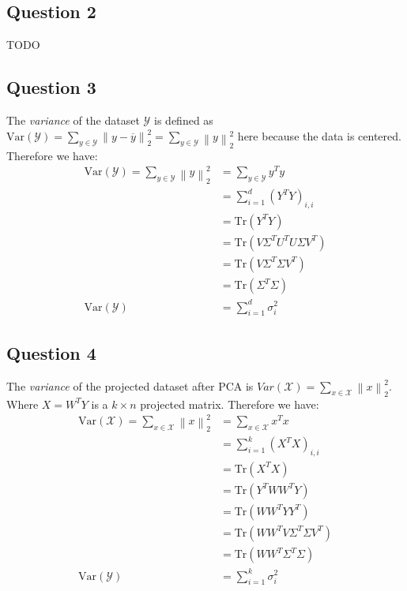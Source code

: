 \documentclass{article}
\begin{document}
\subsection{Question 2}

TODO

\subsection{Question 3}

The \textit{variance} of the dataset $\mathcal{Y}$ is defined as $\text{Var}(\mathcal{Y}) = \sum_{y \in \mathcal{Y}} \left\lVert y - \overline{y} \right\rVert^2_2 = \sum_{y \in \mathcal{Y}} \left\lVert y \right\rVert^2_2$ here because the data is centered. Therefore we have:
\begin{equation}
    \begin{split}
        \text{Var}(\mathcal{Y}) = \sum_{y \in \mathcal{Y}} \left\lVert y \right\rVert^2_2 &= \sum_{y \in \mathcal{Y}} y^T y \\
        &= \sum_{i = 1}^d (Y^T Y)_{i, i} \\
        &= \text{Tr}(Y^T Y) \\
        &= \text{Tr}(V \Sigma^T U^T U \Sigma V^T) \\
        &= \text{Tr}(V \Sigma^T \Sigma V^T) \\
        &= \text{Tr}(\Sigma^T \Sigma) \\
        \text{Var}(\mathcal{Y}) &= \sum_{i = 1}^d \sigma_i^2
    \end{split}
\end{equation}

\subsection{Question 4}

The \textit{variance} of the projected dataset after PCA is $Var(\mathcal{X}) = \sum_{x \in \mathcal{X}} \left\lVert x \right\rVert^2_2$. Where $X = W^TY$ is a $k \times n$ projected matrix. Therefore we have:
\begin{equation}
    \begin{split}
        \text{Var}(\mathcal{X}) = \sum_{x \in \mathcal{X}} \left\lVert x \right\rVert^2_2 &= \sum_{x \in \mathcal{X}} x^T x \\
        &= \sum_{i = 1}^k (X^T X)_{i, i} \\
        &= \text{Tr}(X^T X) \\
        &= \text{Tr}(Y^T W W^T Y) \\
        &= \text{Tr}(W W^T Y Y^T) \\
        &= \text{Tr}(W W^T V \Sigma^T \Sigma V^T) \\
        &= \text{Tr}(W W^T \Sigma^T \Sigma) \\
        \text{Var}(\mathcal{Y}) &= \sum_{i = 1}^k \sigma_i^2
    \end{split}
\end{equation}
\end{document}
